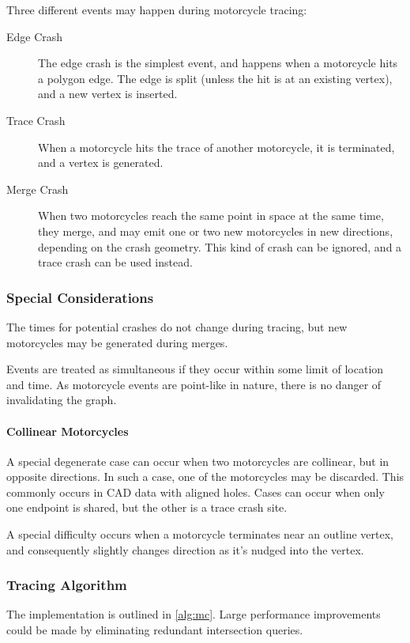 \documentclass[12pt,a4paper,oneside,openany]{article}
\begin{document}
Three different events may happen during motorcycle tracing:
\begin{description}
\item[Edge Crash] The edge crash is the simplest event, and happens when a motorcycle hits a polygon edge. The edge is split (unless the hit is at an existing vertex), and a new vertex is inserted.
\item[Trace Crash] When a motorcycle hits the trace of another motorcycle, it is terminated, and a vertex is generated.
\item[Merge Crash] When two motorcycles reach the same point in space at the same time, they merge, and may emit one or two new motorcycles in new directions, depending on the crash geometry. This kind of crash can be ignored, and a trace crash can be used instead.
\end{description}


\subsubsection{Special Considerations}

The times for potential crashes do not change during tracing, but new motorcycles may be generated during merges.

Events are treated as simultaneous if they occur within some limit of location and time. As motorcycle events are point-like in nature, there is no danger of invalidating the graph.

\paragraph{Collinear Motorcycles}

A special degenerate case can occur when two motorcycles are collinear, but in opposite directions. In such a case, one of the motorcycles may be discarded. This commonly occurs in CAD data with aligned holes. Cases can occur when only one endpoint is shared, but the other is a trace crash site.

A special difficulty occurs when a motorcycle terminates near an outline vertex, and consequently slightly changes direction as it's nudged into the vertex.


\subsubsection{Tracing Algorithm}

The implementation is outlined in  \cref{alg:mc}. Large performance improvements could be made by eliminating redundant intersection queries.
\end{document}
